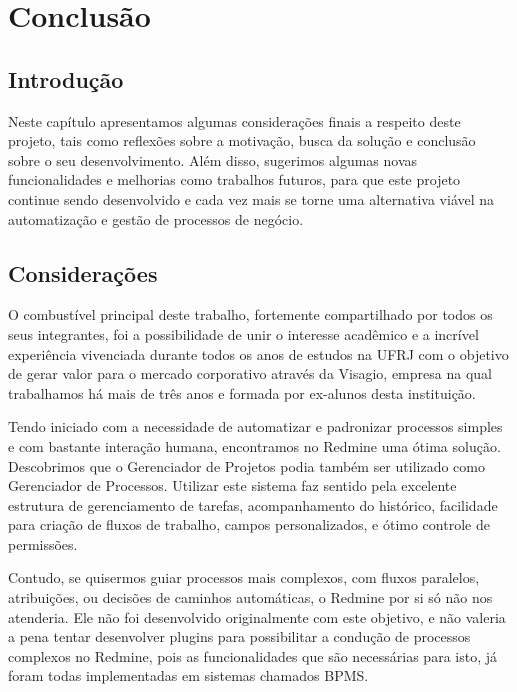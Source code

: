 \chapter{Conclusão}\label{chp:conclusao}

\section{Introdução}\label{sec:conclusao-introducao}
Neste capítulo apresentamos algumas considerações finais a respeito deste projeto, tais como reflexões sobre a motivação, busca da solução e conclusão sobre o seu desenvolvimento. Além disso, sugerimos algumas novas funcionalidades e melhorias como trabalhos futuros, para que este projeto continue sendo desenvolvido e cada vez mais se torne uma alternativa viável na automatização e gestão de processos de negócio.

\section{Considerações}\label{sec:conclusao-introducao}

O combustível principal deste trabalho, fortemente compartilhado por todos os seus integrantes, foi a possibilidade de unir o interesse acadêmico e a incrível experiência vivenciada durante todos os anos de estudos na UFRJ com o objetivo de gerar valor para o mercado corporativo através da Visagio\cite{visagio}, empresa na qual trabalhamos há mais de três anos e formada por ex-alunos desta instituição.

Tendo iniciado com a necessidade de automatizar e padronizar processos simples e com bastante interação humana, encontramos no Redmine uma ótima solução. Descobrimos que o Gerenciador de Projetos podia também ser utilizado como Gerenciador de Processos. Utilizar este sistema faz sentido pela excelente estrutura de gerenciamento de tarefas, acompanhamento do histórico, facilidade para criação de fluxos de trabalho, campos personalizados, e ótimo controle de permissões.

Contudo, se quisermos guiar processos mais complexos, com fluxos paralelos, atribuições, ou decisões de caminhos automáticas, o Redmine por si só não nos atenderia. Ele não foi desenvolvido originalmente com este objetivo, e não valeria a pena tentar desenvolver plugins para possibilitar a condução de processos complexos no Redmine, pois as funcionalidades que são necessárias para isto, já foram todas implementadas em sistemas chamados BPMS.

